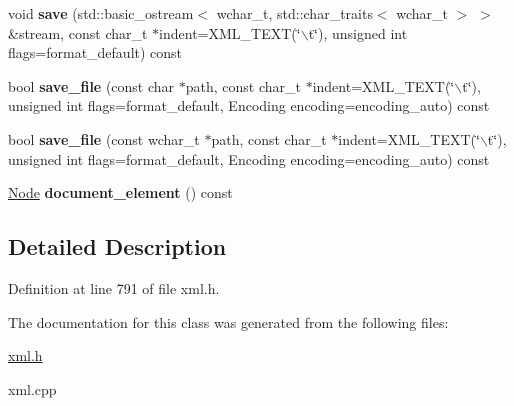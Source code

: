 \begin{DoxyCompactItemize}
\item 
\hypertarget{classphys_1_1xml_1_1Document_a8bdba6317f7ba369c3c83f2e3f77829a}{
void {\bfseries save} (std::basic\_\-ostream$<$ wchar\_\-t, std::char\_\-traits$<$ wchar\_\-t $>$ $>$ \&stream, const char\_\-t $\ast$indent=XML\_\-TEXT(\char`\"{}$\backslash$t\char`\"{}), unsigned int flags=format\_\-default) const }
\label{dd/d44/classphys_1_1xml_1_1Document_a8bdba6317f7ba369c3c83f2e3f77829a}

\item 
\hypertarget{classphys_1_1xml_1_1Document_ac6eebad9e56a83536fac58d35b49b2e1}{
bool {\bfseries save\_\-file} (const char $\ast$path, const char\_\-t $\ast$indent=XML\_\-TEXT(\char`\"{}$\backslash$t\char`\"{}), unsigned int flags=format\_\-default, Encoding encoding=encoding\_\-auto) const }
\label{dd/d44/classphys_1_1xml_1_1Document_ac6eebad9e56a83536fac58d35b49b2e1}

\item 
\hypertarget{classphys_1_1xml_1_1Document_a67a9fc41324ad4a06f53501eb5b74528}{
bool {\bfseries save\_\-file} (const wchar\_\-t $\ast$path, const char\_\-t $\ast$indent=XML\_\-TEXT(\char`\"{}$\backslash$t\char`\"{}), unsigned int flags=format\_\-default, Encoding encoding=encoding\_\-auto) const }
\label{dd/d44/classphys_1_1xml_1_1Document_a67a9fc41324ad4a06f53501eb5b74528}

\item 
\hypertarget{classphys_1_1xml_1_1Document_a481cbf277cfe6d6daf1b66f8d862b88e}{
\hyperlink{classphys_1_1xml_1_1Node}{Node} {\bfseries document\_\-element} () const }
\label{dd/d44/classphys_1_1xml_1_1Document_a481cbf277cfe6d6daf1b66f8d862b88e}

\end{DoxyCompactItemize}


\subsection{Detailed Description}


Definition at line 791 of file xml.h.



The documentation for this class was generated from the following files:\begin{DoxyCompactItemize}
\item 
\hyperlink{xml_8h}{xml.h}\item 
xml.cpp\end{DoxyCompactItemize}
